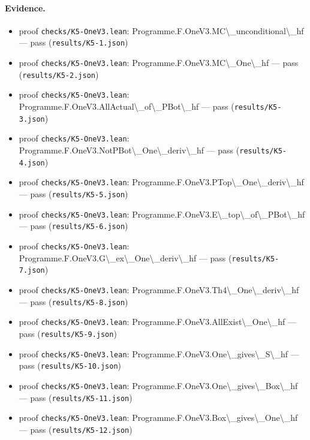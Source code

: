\documentclass{article}
\begin{document}
\paragraph{Evidence.}
\begin{itemize}
\item proof \texttt{checks/K5-OneV3.lean}: Programme.F.OneV3.MC\textbackslash{}\_unconditional\textbackslash{}\_hf --- pass (\texttt{results/K5-1.json})
\item proof \texttt{checks/K5-OneV3.lean}: Programme.F.OneV3.MC\textbackslash{}\_One\textbackslash{}\_hf --- pass (\texttt{results/K5-2.json})
\item proof \texttt{checks/K5-OneV3.lean}: Programme.F.OneV3.AllActual\textbackslash{}\_of\textbackslash{}\_PBot\textbackslash{}\_hf --- pass (\texttt{results/K5-3.json})
\item proof \texttt{checks/K5-OneV3.lean}: Programme.F.OneV3.NotPBot\textbackslash{}\_One\textbackslash{}\_deriv\textbackslash{}\_hf --- pass (\texttt{results/K5-4.json})
\item proof \texttt{checks/K5-OneV3.lean}: Programme.F.OneV3.PTop\textbackslash{}\_One\textbackslash{}\_deriv\textbackslash{}\_hf --- pass (\texttt{results/K5-5.json})
\item proof \texttt{checks/K5-OneV3.lean}: Programme.F.OneV3.E\textbackslash{}\_top\textbackslash{}\_of\textbackslash{}\_PBot\textbackslash{}\_hf --- pass (\texttt{results/K5-6.json})
\item proof \texttt{checks/K5-OneV3.lean}: Programme.F.OneV3.G\textbackslash{}\_ex\textbackslash{}\_One\textbackslash{}\_deriv\textbackslash{}\_hf --- pass (\texttt{results/K5-7.json})
\item proof \texttt{checks/K5-OneV3.lean}: Programme.F.OneV3.Th4\textbackslash{}\_One\textbackslash{}\_deriv\textbackslash{}\_hf --- pass (\texttt{results/K5-8.json})
\item proof \texttt{checks/K5-OneV3.lean}: Programme.F.OneV3.AllExist\textbackslash{}\_One\textbackslash{}\_hf --- pass (\texttt{results/K5-9.json})
\item proof \texttt{checks/K5-OneV3.lean}: Programme.F.OneV3.One\textbackslash{}\_gives\textbackslash{}\_S\textbackslash{}\_hf --- pass (\texttt{results/K5-10.json})
\item proof \texttt{checks/K5-OneV3.lean}: Programme.F.OneV3.One\textbackslash{}\_gives\textbackslash{}\_Box\textbackslash{}\_hf --- pass (\texttt{results/K5-11.json})
\item proof \texttt{checks/K5-OneV3.lean}: Programme.F.OneV3.Box\textbackslash{}\_gives\textbackslash{}\_One\textbackslash{}\_hf --- pass (\texttt{results/K5-12.json})
\end{itemize}
\end{document}
